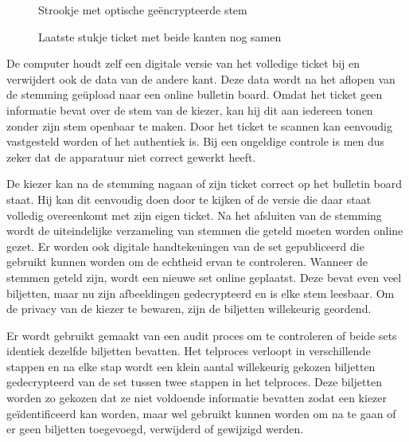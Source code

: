 \begin{figure}[H]
	\caption{Strookje met optische ge\"encrypteerde stem\cite{chaum_secret_ballot}}
	\label{fig:ls:secret_ballot_vote}
\end{figure}

\begin{figure}[H]
	\caption{Laatste stukje ticket met beide kanten nog samen\cite{chaum_secret_ballot}}
	\label{fig:ls:secret_ballot_receipt}
\end{figure}

\npar De computer houdt zelf een digitale versie van het volledige ticket bij en verwijdert ook de data van de andere kant. Deze data wordt na het aflopen van de stemming ge\"upload naar een online bulletin board. Omdat het ticket geen informatie bevat over de stem van de kiezer, kan hij dit aan iedereen tonen zonder zijn stem openbaar te maken. Door het ticket te scannen kan eenvoudig vastgesteld worden of het authentiek is. Bij een ongeldige controle is men dus zeker dat de apparatuur niet correct gewerkt heeft.

\npar De kiezer kan na de stemming nagaan of zijn ticket correct op het bulletin board staat. Hij kan dit eenvoudig doen door te kijken of de versie die daar staat volledig overeenkomt met zijn eigen ticket. Na het afsluiten van de stemming wordt de uiteindelijke verzameling van stemmen die geteld moeten worden online gezet. Er worden ook digitale handtekeningen van de set gepubliceerd die gebruikt kunnen worden om de echtheid ervan te controleren. Wanneer de stemmen geteld zijn, wordt een nieuwe set online geplaatst. Deze bevat even veel biljetten, maar nu zijn afbeeldingen gedecrypteerd en is elke stem leesbaar. Om de privacy van de kiezer te bewaren, zijn de biljetten willekeurig geordend.

\npar Er wordt gebruikt gemaakt van een audit proces om te controleren of beide sets identiek dezelfde biljetten bevatten. Het telproces verloopt in verschillende stappen\cite{chaum_secret_ballot} en na elke stap wordt een klein aantal willekeurig gekozen biljetten gedecrypteerd van de set tussen twee stappen in het telproces. Deze biljetten worden zo gekozen dat ze niet voldoende informatie bevatten zodat een kiezer ge\"identificeerd kan worden, maar wel gebruikt kunnen worden om na te gaan of er geen biljetten toegevoegd, verwijderd of gewijzigd werden.

